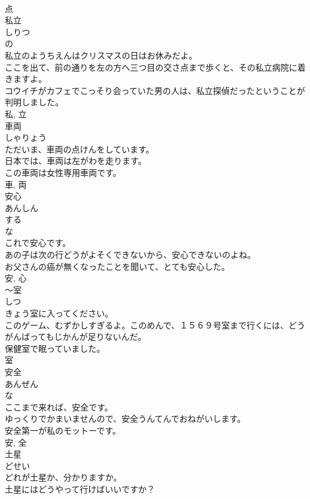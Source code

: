 \documentclass[8pt]{extreport}
\begin{document}
\begin{CJK}{UTF8}{min}
\\	点	
\\	私立	
\\	しりつ	
\\	の 
\\	私立のようちえんはクリスマスの日はお休みだよ。	
\\	ここを出て、前の通りを左の方へ三つ目の交さ点まで歩くと、その私立病院に着きますよ。	
\\	コウイチがカフェでこっそり会っていた男の人は、私立探偵だったということが判明しました。	
\\	私, 立	
\\	車両	
\\	しゃりょう	
\\	ただいま、車両の点けんをしています。	
\\	日本では、車両は左がわを走ります。	
\\	この車両は女性専用車両です。	
\\	車, 両	
\\	安心	
\\	あんしん	
\\	する 
\\	な 
\\	これで安心です。	
\\	あの子は次の行どうがよそくできないから、安心できないのよね。	
\\	お父さんの癌が無くなったことを聞いて、とても安心した。	
\\	安, 心	
\\	〜室	
\\	しつ	
\\	きょう室に入ってください。	
\\	このゲーム、むずかしすぎるよ。このめんで、１５６９号室まで行くには、どうがんばってもじかんが足りないんだ。	
\\	保健室で眠っていました。	
\\	室	
\\	安全	
\\	あんぜん	
\\	な 
\\	ここまで来れば、安全です。	
\\	ゆっくりでかまいませんので、安全うんてんでおねがいします。	
\\	安全第一が私のモットーです。	
\\	安, 全	
\\	土星	
\\	どせい	
\\	どれが土星か、分かりますか。	
\\	土星にはどうやって行けばいいですか？	

\end{CJK}
\end{document}
